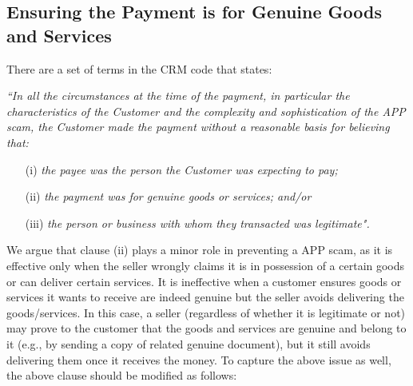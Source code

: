 %

 \subsection{Ensuring the Payment is for Genuine Goods and Services}\label{sec:genuine-goods}
 
 
 
There are a set of terms in the CRM code  that states: 

\noindent\textit{``In all the circumstances at the time of the payment, in particular the characteristics of the Customer and the complexity and sophistication of the APP scam, the Customer made the payment without a reasonable basis for believing that:}
\begin{itemize}
\item[(i)] \textit{the payee was the person the Customer was expecting to pay;}
\item[(ii)] \textit{the payment was for genuine goods or services; and/or}
\item[(iii)] \textit{the person or business with whom they transacted was legitimate".}
\end{itemize}


We argue that    clause (ii) plays a minor role in  preventing a APP scam, as it is effective only when the seller wrongly claims it is in possession of a certain goods or can deliver certain services. It is ineffective when   a customer  ensures goods or services it wants to receive are indeed genuine but the seller avoids delivering the goods/services.  In this case, a seller (regardless of whether it is legitimate or not) may prove to the customer that the goods and services are genuine and belong to it (e.g., by sending a copy of related genuine  document), but it   still avoids delivering them once it receives the money. To capture the above issue as well, the above clause should be modified as follows: 

